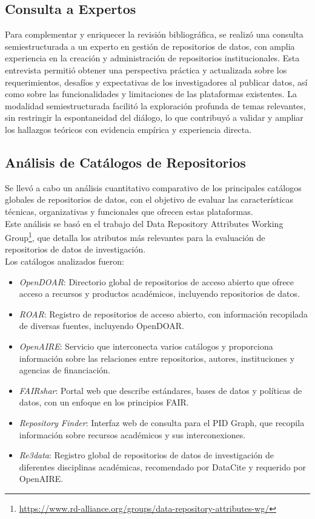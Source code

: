 \documentclass[runningheads]{llncs}
\begin{document}
\subsection{Consulta a Expertos}

Para complementar y enriquecer la revisión bibliográfica, se realizó una consulta semiestructurada a un experto en gestión de repositorios de datos, con amplia experiencia en la creación y administración de repositorios institucionales. Esta entrevista permitió obtener una perspectiva práctica y actualizada sobre los requerimientos, desafíos y expectativas de los investigadores al publicar datos, así como sobre las funcionalidades y limitaciones de las plataformas existentes.
La modalidad semiestructurada facilitó la exploración profunda de temas relevantes, sin restringir la espontaneidad del diálogo, lo que contribuyó a validar y ampliar los hallazgos teóricos con evidencia empírica y experiencia directa.

\subsection{Análisis de Catálogos de Repositorios}

Se llevó a cabo un análisis cuantitativo comparativo de los principales catálogos globales de repositorios de datos, con el objetivo de evaluar las características técnicas, organizativas y funcionales que ofrecen estas plataformas.\\

Este análisis se basó en el trabajo del Data Repository Attributes Working Group\footnote{\url{https://www.rd-alliance.org/groups/data-repository-attributes-wg/}}, que detalla los atributos más relevantes para la evaluación de repositorios de datos de investigación.\\

Los catálogos analizados fueron:
\begin{itemize}
    \item \emph{OpenDOAR}: Directorio global de repositorios de acceso abierto que ofrece acceso a recursos y productos académicos, incluyendo repositorios de datos.
    \item \emph{ROAR}: Registro de repositorios de acceso abierto, con información recopilada de diversas fuentes, incluyendo OpenDOAR.
    \item \emph{OpenAIRE}: Servicio que interconecta varios catálogos y proporciona información sobre las relaciones entre repositorios, autores, instituciones y agencias de financiación.
    \item \emph{FAIRshar}: Portal web que describe estándares, bases de datos y políticas de datos, con un enfoque en los principios FAIR.
    \item \emph{Repository Finder}: Interfaz web de consulta para el PID Graph, que recopila información sobre recursos académicos y sus interconexiones.
    \item \emph{Re3data}: Registro global de repositorios de datos de investigación de diferentes disciplinas académicas, recomendado por DataCite y requerido por OpenAIRE.
\end{itemize}
\end{document}
